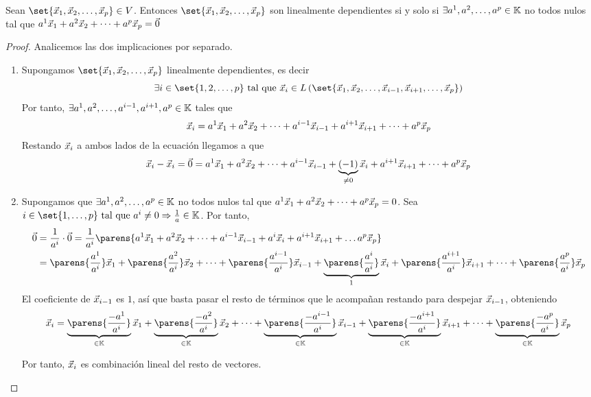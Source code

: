 \documentclass[../algebra_lineal.tex]{subfiles}
\begin{document}
\begin{proposition}
   Sean $\set{\vlst{x}{p}} \in V$. Entonces  $\set{\vlst{x}{p}}$ son linealmente dependientes si y solo si $\exists {a}^{1}, {a}^{2}, \dots, {a}^{p} \in \mathbb{K}$ no todos nulos tal que ${a}^{1}\vec{x}_{1}+{a}^{2}\vec{x}_{2}+\dots+{a}^{p}\vec{x}_{p} = \vec{0}$

\end{proposition}

\begin{proof}

    Analicemos las dos implicaciones por separado.
    \begin{enumerate}
        \item[\protect\fbox{$\Rightarrow$}] Supongamos $\set{\vlst{x}{p}}$ linealmente dependientes, es decir 
        \[\exists i \in \set{1, 2, \dots, p} \st \vx_i \in \lspan{\set{\vlst{x}{i-1}, \vx_{i+1}, \dots, \vx_p}}\]
        Por tanto, $\exists {a}^{1}, {a}^{2}, \dots, {a}^{i-1}, a^{i+1}, a^p \in \mathbb{K}$ tales que 
        \[
            \vec{x}_i = {a}^{1}\vec{x}_{1}+{a}^{2}\vec{x}_{2}+\dots+{a}^{i-1}\vec{x}_{i-1}+a^{i+1}\vec{x}_{i+1}+\dots+a^p \vec{x}_p  
        \]
        Restando $\vec{x}_i$ a ambos lados de la ecuación llegamos a que
        \[
            \vec{x}_i - \vec{x}_i = \vec{0}  = {a}^{1}\vec{x}_{1}+{a}^{2}\vec{x}_{2}+\dots+{a}^{i-1}\vec{x}_{i-1}+\underbrace{(-1)}_{\ne 0}\vec{x}_i +a^{i+1}\vec{x}_{i+1}+\dots+a^p \vec{x}_p
        \]
        \item[\protect\fbox{$\Leftarrow$}] Supongamos que $\exists {a}^{1}, {a}^{2}, \dots, {a}^{p} \in \mathbb{K}$ no todos nulos tal que ${a}^{1}\vec{x}_{1}+{a}^{2}\vec{x}_{2}+\dots+{a}^{p}\vec{x}_{p} = 0$. Sea $i\in \set{1, \dots, p} \st a^i \ne 0 \Rightarrow \frac{1}{a} \in \K$. Por tanto,
        \begin{align*}
            \zv &= \frac{1}{a^i} \cdot \zv = \frac{1}{a^i}\parens{ \lincomb{a}{x}{i-1} + a^i\vx_i + a^{i+1}\vx_{i+1} + \dots a^p\vx_p} \\
                &= \parens{\frac{a^1}{a^i}}\vx_1 + \parens{\frac{a^2}{a^i}}\vx_2 + \dots + \parens{\frac{a^{i-1}}{a^i}}\vx_{i-1} + \underbrace{\parens{\frac{a^{i}}{a^i}}}_{1}\vx_{i} + \parens{\frac{a^{i+1}}{a^i}}\vx_{i+1} + \dots + \parens{\frac{a^{p}}{a^i}}\vx_{p}
        \end{align*}
        El coeficiente de $\vec{x}_{i-1}$ es $1$, así que basta pasar el resto de términos que le acompañan restando para despejar $\vec{x}_{i-1}$, obteniendo 
        \[
           \vx_{i} = \underbrace{\parens{\frac{-a^1}{a^i}}}_{\in \K}\vx_1 + \underbrace{\parens{\frac{-a^2}{a^i}}}_{\in \K}\vx_2 + \dots + \underbrace{\parens{\frac{-a^{i-1}}{a^i}}}_{\in \K}\vx_{i-1} + \underbrace{\parens{\frac{-a^{i+1}}{a^i}}}_{\in \K}\vx_{i+1} + \dots + \underbrace{\parens{\frac{-a^{p}}{a^i}}}_{\in \K}\vx_{p}
        \]

        Por tanto, $\vec{x}_i$ es combinación lineal del resto de vectores.
    \end{enumerate}
\end{proof}
\end{document}
